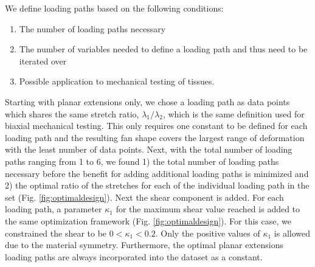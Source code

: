     
    We define loading paths based on the following conditions: 
\begin{enumerate}
\item The number of loading paths necessary
\item The number of variables needed to define a loading path and thus need to be iterated over
\item Possible application to mechanical testing of tissues.
\end{enumerate} 
Starting with planar extensions only, we chose a loading path as data points which shares the same stretch ratio, $\lambda_1/\lambda_2$, which is the same definition used for biaxial mechanical testing. This only requires one constant to be defined for each loading path and the resulting fan shape covers the largest range of deformation with the least number of data points. Next, with the total number of loading paths ranging from 1 to 6, we found 1) the total number of loading paths necessary before the benefit for adding additional loading paths is minimized and 2) the optimal ratio of the stretches for each of the individual loading path in the set (Fig. \ref{fig:optimaldesign}). Next the shear component is added. For each loading path, a parameter $\kappa_1$ for the maximum shear value reached is added to the same optimization framework (Fig. \ref{fig:optimaldesign}). For this case, we constrained the shear to be $0<\kappa_1<0.2$. Only the positive values of $\kappa_1$ is allowed due to the material symmetry. Furthermore, the optimal planar extensions loading paths are always incorporated into the dataset as a constant.



    


    
